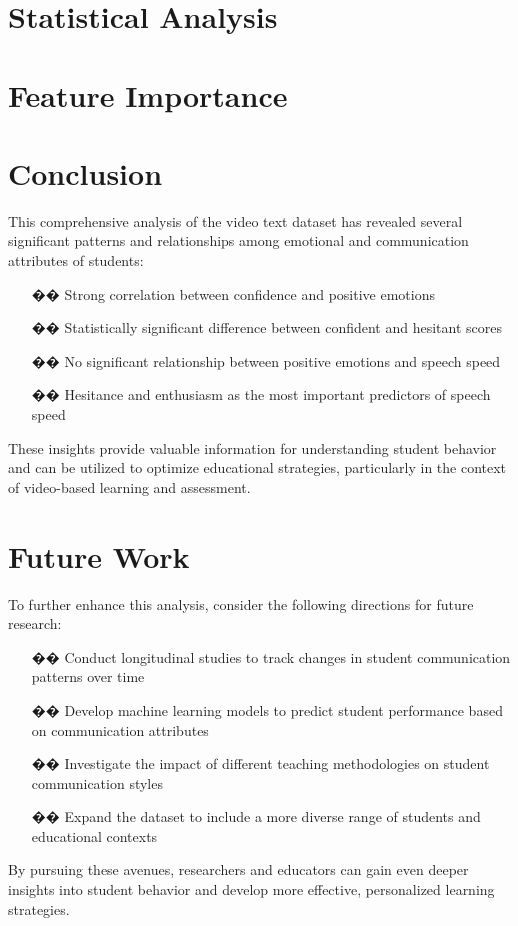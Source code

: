 \documentclass{article}
\begin{document}

\section{Statistical Analysis}

\section{Feature Importance}

\section{Conclusion}
This comprehensive analysis of the video text dataset has revealed several significant patterns and relationships among emotional and communication attributes of students:

\begin{enumerate}
    \item [\textcolor{accentColor1}{��}] Strong correlation between confidence and positive emotions
    \item [\textcolor{accentColor2}{��}] Statistically significant difference between confident and hesitant scores
    \item [\textcolor{accentColor3}{��️}] No significant relationship between positive emotions and speech speed
    \item [\textcolor{primaryColor}{��}] Hesitance and enthusiasm as the most important predictors of speech speed
\end{enumerate}

These insights provide valuable information for understanding student behavior and can be utilized to optimize educational strategies, particularly in the context of video-based learning and assessment.

\section{Future Work}
To further enhance this analysis, consider the following directions for future research:

\begin{enumerate}
    \item [\textcolor{accentColor1}{��}] Conduct longitudinal studies to track changes in student communication patterns over time
    \item [\textcolor{accentColor2}{��}] Develop machine learning models to predict student performance based on communication attributes
    \item [\textcolor{accentColor3}{��}] Investigate the impact of different teaching methodologies on student communication styles
    \item [\textcolor{primaryColor}{��}] Expand the dataset to include a more diverse range of students and educational contexts
\end{enumerate}

By pursuing these avenues, researchers and educators can gain even deeper insights into student behavior and develop more effective, personalized learning strategies.
\end{document}
